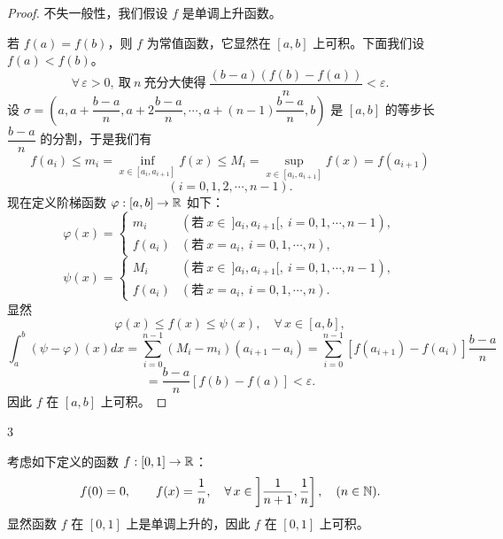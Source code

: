 \begin{proof}

	不失一般性，我们假设 \(f\) 是单调上升函数。

	若 \(f(a)=f(b)\)，则 \(f\) 为常值函数，它显然在 \([a,b]\) 上可积。下面我们设 \(f(a)<f(b)\)。
	\[
	\forall\,\varepsilon>0,\ \text{取}\ n\ \text{充分大使得}\ \frac{(b-a)(f(b)-f(a))}{n}<\varepsilon.
	\]
	设 \(\sigma=\left(a,a+\dfrac{b-a}{n},a+2\dfrac{b-a}{n},\cdots,a+(n-1)\dfrac{b-a}{n},b\right)\) 是 \([a,b]\) 的等步长 \(\dfrac{b-a}{n}\) 的分割，于是我们有
	\[
	f(a_i)\le m_i=\inf_{x\in[a_i,a_{i+1}]}f(x)\le M_i=\sup_{x\in[a_i,a_{i+1}]}f(x)=f(a_{i+1})
	\]
	\[
	(i=0,1,2,\cdots,n-1).
	\]
	现在定义阶梯函数 \(\varphi:[a,b]\to\mathbb{R}\) 如下：
	\[
	\varphi(x)=\begin{cases} m_i & (\text{若}\ x\in\ ]a_i,a_{i+1}[,\ i=0,1,\cdots,n-1), \\ f(a_i) & (\text{若}\ x=a_i,\ i=0,1,\cdots,n), \end{cases}
	\]
	\[
	\psi(x)=\begin{cases} M_i & (\text{若}\ x\in\ ]a_i,a_{i+1}[,\ i=0,1,\cdots,n-1), \\ f(a_i) & (\text{若}\ x=a_i,\ i=0,1,\cdots,n). \end{cases}
	\]
	显然
	\[
	\varphi(x)\le f(x)\le\psi(x),\quad\forall\,x\in[a,b],
	\]
	\[
	\int_a^b(\psi-\varphi)(x)dx=\sum_{i=0}^{n-1}(M_i-m_i)(a_{i+1}-a_i)=\sum_{i=0}^{n-1}[f(a_{i+1})-f(a_i)]\frac{b-a}{n}
	\]
	\[
	=\frac{b-a}{n}[f(b)-f(a)]<\varepsilon.
	\]
	因此 \(f\) 在 \([a,b]\) 上可积。

\end{proof}

\begin{sourceexample}{3}

	考虑如下定义的函数 \(f:[0,1]\to\mathbb{R}\)：
	\[
	f(0)=0,\qquad f(x)=\frac1n,\quad\forall\,x\in\left]\frac1{n+1},\frac1n\right],\quad(n\in\mathbb{N}).
	\]
	显然函数 \(f\) 在 \([0,1]\) 上是单调上升的，因此 \(f\) 在 \([0,1]\) 上可积。

\end{sourceexample}

